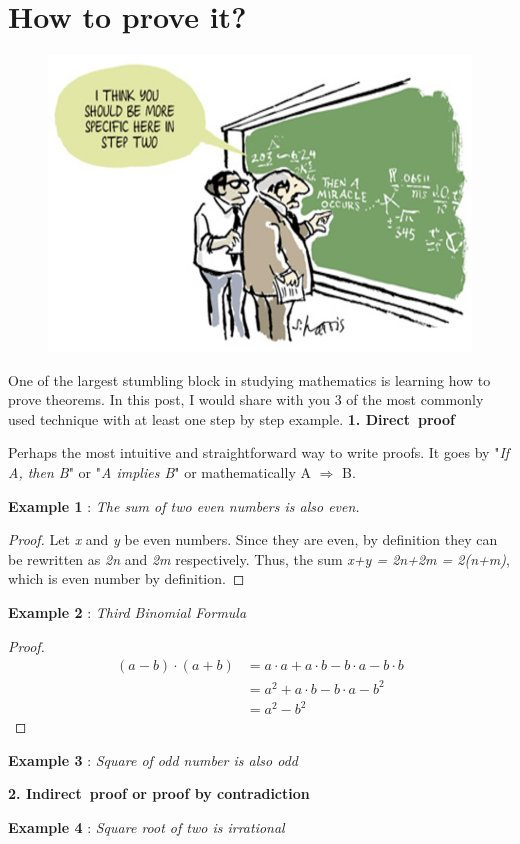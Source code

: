 \chapter{How to prove it?}
\begin{figure}[htp]
	\centering
	\includegraphics[width=\linewidth]{Assets/0_W-tEtGVYH9eM9HNx}
	\caption{}
	\label{fig:specific}
\end{figure}

One of the largest stumbling block in studying mathematics is learning how to prove theorems. In this post, I would share with you 3 of the most commonly used technique with at least one step by step example.
\newpage
\noindent \textbf{1. Direct proof}

\noindent Perhaps the most intuitive and straightforward way to write proofs. It goes by "\textit{If A, then B}" or  "\textit{A implies B}" or mathematically A $\Rightarrow$ B.

\noindent\textbf{Example 1} : \textit{The sum of two even numbers is also even.}
\begin{proof}
	Let \textit{x} and \textit{y} be even numbers. Since they are even, by definition they can be rewritten as \textit{2n} and \textit{2m} respectively. Thus, the sum \textit{x+y = 2n+2m = 2(n+m)}, which is even number by definition.
\end{proof}
\noindent\textbf{Example 2} : \textit{Third Binomial Formula}
\begin{proof}
\begin{align}
(a-b)\cdot (a+b)&= a\cdot a+a\cdot b-b \cdot a-b \cdot b\\ 
			&= a^2+a \cdot b-b \cdot a-b^2\\ 
			&= a^2-b^2 
\end{align}
\end{proof}
\noindent\textbf{Example 3} : \textit{Square of odd number is also odd}

\noindent \textbf{2. Indirect proof or proof by contradiction}

\noindent\textbf{Example 4} : \textit{Square root of two is irrational}

